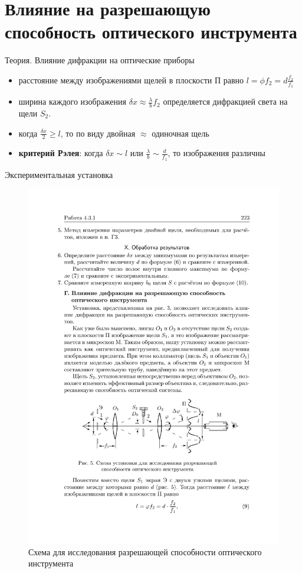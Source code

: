 \documentclass[11pt]{beamer} %
\begin{document}
    \section{Влияние на разрешающую способность оптического инструмента}
    \begin{frame}{Теория. Влияние дифракции на оптические приборы}
    \begin{itemize}
        \item расстояние между изображениями щелей в плоскости П равно $l = \phi f_2 = d \frac{f_2}{f_1}$
        \item ширина каждого изображения $\delta x \approx \frac{\lambda}{b}f_2$ определяется дифракцией света на щели $S_2$.
        \item когда $\frac{\delta x}{2} \ge l$, то по виду двойная $\approx$ одиночная щель
        \item \textbf{критерий Рэлея}: когда $\delta x \sim l$ или $\frac{\lambda}{b} \sim \frac{d}{f_1}$, то изображения различны
    \end{itemize}
    \end{frame}

   \begin{frame}{Экспериментальная установка}
      \begin{figure}[H]
          \centering
          \includegraphics[width = \textwidth]{images/d.pdf}
          \caption{Схема для исследования разрешающей способности оптического инструмента}
          \label{fig:inst_d}
      \end{figure}
   \end{frame}
\end{document}
